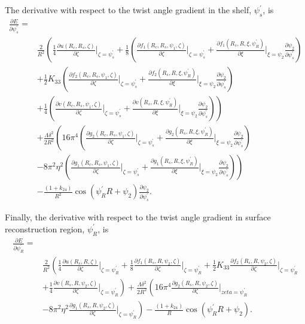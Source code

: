 \documentclass[12pt]{article}
\begin{document}
The derivative with respect to the twist angle gradient in the shelf, $\psi_s^{\prime}$, is
\begin{align}
\frac{\partial E}{\partial \psi_s^{\prime}}=&\nonumber\\
&\frac{2}{R^2}\left(\frac{1}{4}\frac{\partial u(R_c,R_s,\zeta)}{\partial\zeta}\bigg|_{\zeta=\psi_s^{\prime}}+\frac{1}{8}\left(\frac{\partial f_1(R_c,R_s,\psi_1,\zeta)}{\partial\zeta}\bigg|_{\zeta=\psi_s^{\prime}}+\frac{\partial f_1(R_s,R,\xi,\psi_R^{\prime})}{\partial\xi}\bigg|_{\xi=\psi_2}\frac{\partial\psi_2}{\partial\psi_s^{\prime}}\right)\right.\nonumber\\
&+\frac{1}{2}K_{33}\left(\frac{\partial f_2(R_c,R_s,\psi_1,\zeta)}{\partial\zeta}\bigg|_{\zeta=\psi_s^{\prime}}+\frac{\partial f_2(R_s,R,\xi,\psi_R^{\prime})}{\partial\xi}\bigg|_{\xi=\psi_2}\frac{\partial\psi_2}{\partial\psi_s^{\prime}}\right)\nonumber\\
&\left.+\frac{1}{4}\left(\frac{\partial v(R_c,R_s,\psi_1,\zeta)}{\partial\zeta}\bigg|_{\zeta=\psi_s^{\prime}}+\frac{\partial v(R_s,R,\xi,\psi_R^{\prime})}{\partial\xi}\bigg|_{\xi=\psi_2}\frac{\partial\psi_2}{\partial\psi_s^{\prime}}\right)\right)\nonumber\\
&+\frac{\Lambda\delta^2}{2R^2}\left(16\pi^4\left(\frac{\partial g_2(R_c,R_s,\psi_1,\zeta)}{\partial\zeta}\bigg|_{\zeta=\psi_s^{\prime}}+\frac{\partial g_2(R_s,R,\xi,\psi_R^{\prime})}{\partial\xi}\bigg|_{\xi=\psi_2}\frac{\partial\psi_2}{\partial\psi_s^{\prime}}\right)\right.\nonumber\\
&\left.-8\pi^2\eta^2\left(\frac{\partial g_1(R_c,R_s,\psi_1,\zeta)}{\partial\zeta}\bigg|_{\zeta=\psi_s^{\prime}}+\frac{\partial g_1(R_s,R,\xi,\psi_R^{\prime})}{\partial\xi}\bigg|_{\xi=\psi_2}\frac{\partial\psi_2}{\partial\psi_s^{\prime}}\right)\right)\nonumber\\
&-\frac{(1+k_{24})}{R^2}\cos(\psi_R^{\prime}R+\psi_2)\frac{\partial\psi_2}{\partial\psi_s^{\prime}}.\label{eq:dEdpsi_sp}
\end{align}

Finally, the derivative with respect to the twist angle gradient in surface reconstruction region, $\psi_R^{\prime}$, is
\begin{align}
\frac{\partial E}{\partial \psi_R^{\prime}}=&\nonumber\\
&\frac{2}{R^2}\left(\frac{1}{4}\frac{\partial u(R_s,R,\zeta)}{\partial\zeta}\bigg|_{\zeta=\psi_R^{\prime}}+\frac{1}{8}\frac{\partial f_1(R_s,R,\psi_2,\zeta)}{\partial\zeta}\bigg|_{\zeta=\psi_R^{\prime}}+\frac{1}{2}K_{33}\frac{\partial f_2(R_s,R,\psi_2,\zeta)}{\partial\zeta}\bigg|_{\zeta=\psi_R^{\prime}}\right.\nonumber\\
&\left.+\frac{1}{4}\frac{\partial v(R_s,R,\psi_2,\zeta)}{\partial\zeta}\bigg|_{\zeta=\psi_R^{\prime}}\right)+\frac{\Lambda\delta^2}{2R^2}\left(16\pi^4\frac{\partial g_2(R_s,R,\psi_2,\zeta)}{\partial\zeta}\bigg|_{zeta=\psi_R^{\prime}}\right.\nonumber\\
&\left.-8\pi^2\eta^2\frac{\partial g_1(R_s,R,\psi_2,\zeta)}{\partial\zeta}\bigg|_{\zeta=\psi_R^{\prime}}\right)-\frac{(1+k_{24})}{R}\cos(\psi_R^{\prime}R+\psi_2).\label{eq:dEdpsi_Rc}
\end{align}
\end{document}
